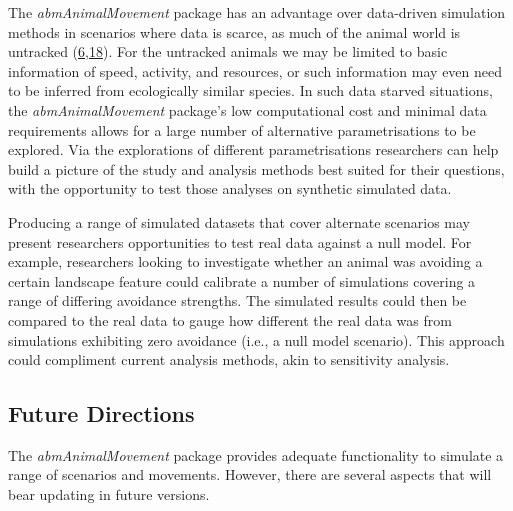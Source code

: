 \documentclass[10pt,a4paper]{article}
\begin{document}
The \emph{abmAnimalMovement} package has an advantage over data-driven simulation methods in scenarios where data is scarce, as much of the animal world is untracked (\protect\hyperlink{ref-joo_recent_2022}{6},\protect\hyperlink{ref-crane_lots_2021}{18}).
For the untracked animals we may be limited to basic information of speed, activity, and resources, or such information may even need to be inferred from ecologically similar species.
In such data starved situations, the \emph{abmAnimalMovement} package's low computational cost and minimal data requirements allows for a large number of alternative parametrisations to be explored.
Via the explorations of different parametrisations researchers can help build a picture of the study and analysis methods best suited for their questions, with the opportunity to test those analyses on synthetic simulated data.

Producing a range of simulated datasets that cover alternate scenarios may present researchers opportunities to test real data against a null model.
For example, researchers looking to investigate whether an animal was avoiding a certain landscape feature could calibrate a number of simulations covering a range of differing avoidance strengths.
The simulated results could then be compared to the real data to gauge how different the real data was from simulations exhibiting zero avoidance (i.e., a null model scenario).
This approach could compliment current analysis methods, akin to sensitivity analysis.

\hypertarget{future-directions}{%
\subsection{Future Directions}\label{future-directions}}

The \emph{abmAnimalMovement} package provides adequate functionality to simulate a range of scenarios and movements.
However, there are several aspects that will bear updating in future versions.
\end{document}
